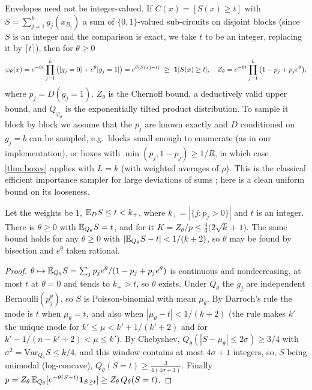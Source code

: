 Envelopes need not be integer-valued. If
$C(x)=[S(x)\ge t]$ with $S=\sum_{j=1}^k g_j(x_{B_j})$ a sum of
$\{0,1\}$-valued sub-circuits on disjoint blocks (since $S$ is an integer and the
comparison is exact, we take $t$ to be an integer, replacing it by $\lceil t\rceil$),
then for $\theta\ge0$
\[
\varphi_\theta(x)=e^{-\theta t}\prod_{j=1}^k\big([g_j=0]+e^{\theta}[g_j=1]\big)=e^{\theta(S(x)-t)}\ \ge\ \one[S(x)\ge t],\quad
Z_\theta=e^{-\theta t}\prod_{j=1}^k\big(1-p_j+p_je^{\theta}\big),
\]
where $p_j=D(g_j=1)$. $Z_\theta$ is the Chernoff bound, a deductively valid
upper bound, and $Q_{\varphi_\theta}$ is the exponentially tilted product
distribution. To sample it block by block we assume that the $p_j$ are known
exactly and $D$ conditioned on $g_j=b$ can be sampled, e.g.\ blocks small enough
to enumerate (as in our implementation), or boxes with $\min(p_j,1-p_j)\ge1/R$, in
which case \cref{thm:boxes} applies with $L=k$ (with weighted averages of $\rho$).
This is the classical efficient importance sampler for large deviations of sums
\cite{siegmund1976,bucklew2004}; here is a clean uniform bound on its looseness.

\begin{proposition}\label{prop:tilting}
Let the weights be $1$, $\mathbb{E}_D S\le t<k_+$, where $k_+=|\{j:p_j>0\}|$ and $t$ is an
integer. There is $\theta\ge0$ with $\mathbb{E}_{Q_\theta}S=t$, and for it
$K=Z_\theta/p\le\tfrac43\big(2\sqrt{k}+1\big)$. The same bound holds for any
$\theta\ge0$ with $|\mathbb{E}_{Q_\theta}S-t|<1/(k+2)$, so $\theta$ may be found by bisection
and $e^\theta$ taken rational.
\end{proposition}

\begin{proof}
$\theta\mapsto\mathbb{E}_{Q_\theta}S=\sum_jp_je^\theta/(1-p_j+p_je^\theta)$ is continuous and
nondecreasing, at most $t$ at $\theta=0$ and tends to $k_+>t$, so $\theta$ exists.
Under $Q_\theta$ the $g_j$ are independent Bernoulli$(p_j^\theta)$, so $S$ is
Poisson-binomial with mean $\mu_\theta$. By Darroch's rule \cite{darroch1964} the
mode is $t$ when $\mu_\theta=t$, and also when $|\mu_\theta-t|<1/(k+2)$ (the rule
makes $k'$ the unique mode for $k'\le\mu<k'+1/(k'+2)$ and for
$k'-1/(n-k'+2)<\mu\le k'$). By Chebyshev,
$Q_\theta(|S-\mu_\theta|\le2\sigma)\ge3/4$ with $\sigma^2=\mathrm{Var}_{Q_\theta}S\le
k/4$, and this window contains at most $4\sigma+1$ integers, so, $S$ being unimodal
(log-concave), $Q_\theta(S=t)\ge\frac{3}{4(4\sigma+1)}$. Finally
$p=Z_\theta\,\mathbb{E}_{Q_\theta}[e^{-\theta(S-t)}\mathbf{1}_{S\ge t}]\ge Z_\theta\,Q_\theta(S=t)$.
\end{proof}

